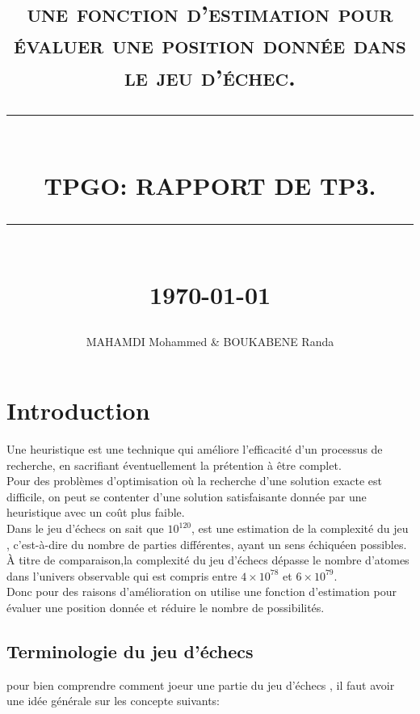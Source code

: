 \documentclass[12pt]{report}
\newcommand{\HRule}[1]{\rule{\linewidth}{#1}}
\begin{document}
\renewcommand{\contentsname}{Table des Matières}
\renewcommand{\listfigurename}{Table des Figures}
\author{MAHAMDI Mohammed & BOUKABENE Randa }       
\date{} 
\title{  \textsc{  une fonction d'estimation pour évaluer une position donnée dans le jeu d'échec.}
		\\ [2.0cm]
		\HRule{0.5pt} \\
		\LARGE \textbf{\uppercase{TPGO:  Rapport de TP3. }}
		\HRule{2pt} \\ [0.5cm]
		\normalsize \today \vspace*{5\baselineskip}}
\maketitle
\tableofcontents
\newpage
\listoffigures 
\newpage
\sectionfont{\scshape}
\newpage
	\chapter{Introduction}
	
	Une heuristique est une technique qui améliore l'efficacité d'un
	processus de recherche, en sacrifiant éventuellement la prétention
	à être complet.\\
	
	Pour des problèmes d'optimisation où la recherche d'une solution
	exacte est difficile, on peut se contenter d'une solution satisfaisante donnée par une heuristique	avec un coût plus faible.\\
	
	Dans le jeu d'échecs on sait que  $10^{120}$, est une estimation de la complexité du jeu , c'est-à-dire du nombre de parties différentes, ayant un sens échiquéen possibles.\\
	
	 À titre de comparaison,la complexité du jeu d'échecs dépasse le  nombre d'atomes dans l'univers observable qui est compris entre $4×10^{78}$ et $6×10^{79}$.\\
	
	Donc pour des raisons d'amélioration on utilise une fonction d'estimation pour évaluer une position donnée et réduire le nombre de possibilités. 
	 
	\newpage
	\section{Terminologie du jeu d'échecs}
	pour bien comprendre comment joeur une partie du jeu d'échecs , il faut avoir une idée générale sur les concepte suivants:
	
\end{document}
